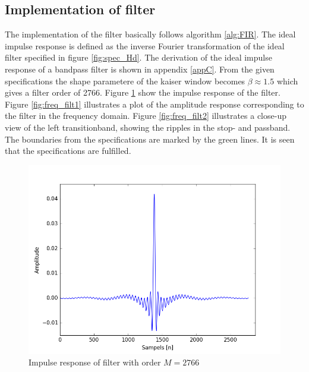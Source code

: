 \subsection{Implementation of filter}
The implementation of the filter basically follows algorithm \ref{alg:FIR}. The ideal impulse response is defined as the inverse Fourier transformation of the ideal filter specified in figure \ref{fig:spec_Hd}. The derivation of the ideal impulse response of a bandpass filter is shown in appendix \ref{appC}. From the given specifications the shape parametere of the kaiser window becomes $\beta \approx 1.5$ which gives a filter order of 2766. Figure \ref{fig:FIRimpulse} show the impulse response of the filter. Figure \ref{fig:freq_filt1} illustrates a plot of the amplitude response corresponding to the filter in the frequency domain. Figure \ref{fig:freq_filt2} illustrates a close-up view of the left transitionband, showing the ripples in the stop- and passband. The boundaries from the specifications are marked by the green lines. It is seen that the specifications are fulfilled. 
\begin{figure}[h]
\centering 
\includegraphics[scale=0.5]{figures/filtertest/impulse.png}
\caption{Impulse response of filter with order $M=2766$}
\label{fig:FIRimpulse}
\end{figure}
       
